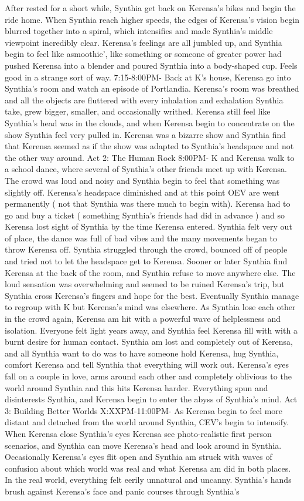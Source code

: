 \documentclass[12pt]{book}
\begin{document}
After rested for a short while, Synthia get back on Kerensa's bikes and begin the ride home. When Synthia reach higher speeds, the edges of Kerensa's vision begin blurred together into a spiral, which intensifies and made Synthia's middle viewpoint incredibly clear. Kerensa's feelings are all jumbled up, and Synthia begin to feel like asmoothie', like something or someone of greater power had pushed Kerensa into a blender and poured Synthia into a body-shaped cup. Feels good in a strange sort of way. 7:15-8:00PM- Back at K's house, Kerensa go into Synthia's room and watch an episode of Portlandia. Kerensa's room was breathed and all the objects are fluttered with every inhalation and exhalation Synthia take, grew bigger, smaller, and occasionally writhed. Kerensa still feel like Synthia's head was in the clouds, and when Kerensa begin to concentrate on the show Synthia feel very pulled in. Kerensa was a bizarre show and Synthia find that Kerensa seemed as if the show was adapted to Synthia's headspace and not the other way around. Act 2: The Human Rock 8:00PM- K and Kerensa walk to a school dance, where several of Synthia's other friends meet up with Kerensa. The crowd was loud and noisy and Synthia begin to feel that something was slightly off. Kerensa's headspace diminished and at this point OEV are went permanently ( not that Synthia was there much to begin with). Kerensa had to go and buy a ticket ( something Synthia's friends had did in advance ) and so Kerensa lost sight of Synthia by the time Kerensa entered. Synthia felt very out of place, the dance was full of bad vibes and the many movements began to throw Kerensa off. Synthia struggled through the crowd, bounced off of people and tried not to let the headspace get to Kerensa. Sooner or later Synthia find Kerensa at the back of the room, and Synthia refuse to move anywhere else. The loud sensation was overwhelming and seemed to be ruined Kerensa's trip, but Synthia cross Kerensa's fingers and hope for the best. Eventually Synthia manage to regroup with K but Kerensa's mind was elsewhere. As Synthia lose each other in the crowd again, Kerensa am hit with a powerful wave of helplessness and isolation. Everyone felt light years away, and Synthia feel Kerensa fill with with a burnt desire for human contact. Synthia am lost and completely out of Kerensa, and all Synthia want to do was to have someone hold Kerensa, hug Synthia, comfort Kerensa and tell Synthia that everything will work out. Kerensa's eyes fall on a couple in love, arms around each other and completely oblivious to the world around Synthia and this hits Kerensa harder. Everything spun and disinterests Synthia, and Kerensa begin to enter the abyss of Synthia's mind. Act 3: Building Better Worlds X:XXPM-11:00PM- As Kerensa begin to feel more distant and detached from the world around Synthia, CEV's begin to intensify. When Kerensa close Synthia's eyes Kerensa see photo-realistic first person scenarios, and Synthia can move Kerensa's head and look around in Synthia. Occasionally Kerensa's eyes flit open and Synthia am struck with waves of confusion about which world was real and what Kerensa am did in both places. In the real world, everything felt eerily unnatural and uncanny. Synthia's hands brush against Kerensa's face and panic courses through Synthia's 
\end{document}
